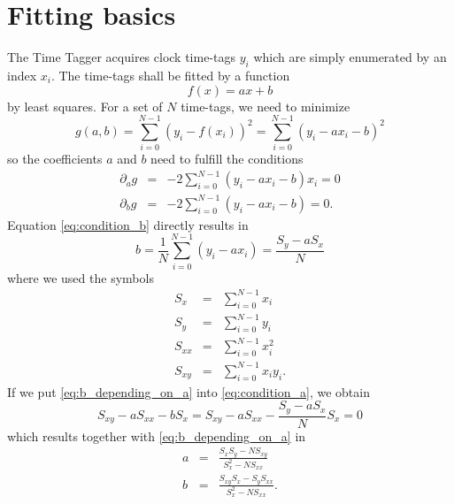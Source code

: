 \documentclass[]{scrreprt}
\begin{document}
\chapter{Fitting basics}
The Time Tagger acquires clock time-tags $y_i$ which are simply enumerated by an index $x_i$. The time-tags shall be fitted by a function
\begin{equation}
    f(x) = ax + b
\end{equation}
by least squares. For a set of $N$ time-tags, we need to minimize
\begin{equation}
    g(a, b) = \sum_{i=0}^{N-1}\left(y_i - f(x_i)\right)^2
            = \sum_{i=0}^{N-1}\left(y_i - a x_i - b\right)^2
\end{equation}
so the coefficients $a$ and $b$ need to fulfill the conditions
\begin{eqnarray}
    \partial_a g &=& -2 \sum_{i=0}^{N-1} \left(y_i - a x_i - b\right) x_i = 0 \label{eq:condition_a}\\
    \partial_b g &=& -2 \sum_{i=0}^{N-1} \left(y_i - a x_i - b\right) = 0.\label{eq:condition_b}
\end{eqnarray}
Equation \ref{eq:condition_b} directly results in
\begin{equation}
    b = \frac{1}{N} \sum_{i=0}^{N-1} \left(y_i - a x_i\right) = \frac{S_y - a S_x}{N} \label{eq:b_depending_on_a}
\end{equation}
where we used the symbols
\begin{eqnarray}
    S_x &=& \sum_{i=0}^{N-1} x_i \nonumber \\
    S_y &=& \sum_{i=0}^{N-1} y_i \nonumber \\
    S_{xx} &=& \sum_{i=0}^{N-1} x_i^2 \nonumber \\
    S_{xy} &=& \sum_{i=0}^{N-1} x_i y_i. \nonumber
\end{eqnarray}
If we put \ref{eq:b_depending_on_a} into \ref{eq:condition_a}, we obtain
\begin{equation}
    S_{xy} - a S_{xx} - b S_x = S_{xy} - a S_{xx} - \frac{S_y - a S_x}{N} S_x = 0
\end{equation}
which results together with \ref{eq:b_depending_on_a} in
\begin{eqnarray}
    a &=& \frac{S_x S_y - N S_{xy}}{S_x^2 - N S_{xx}} \\
    b &=& \frac{S_{xy} S_x - S_y S_{xx}}{S_x^2 - N S_{xx}}. \label{eq:b_basic}
\end{eqnarray}
\end{document}
